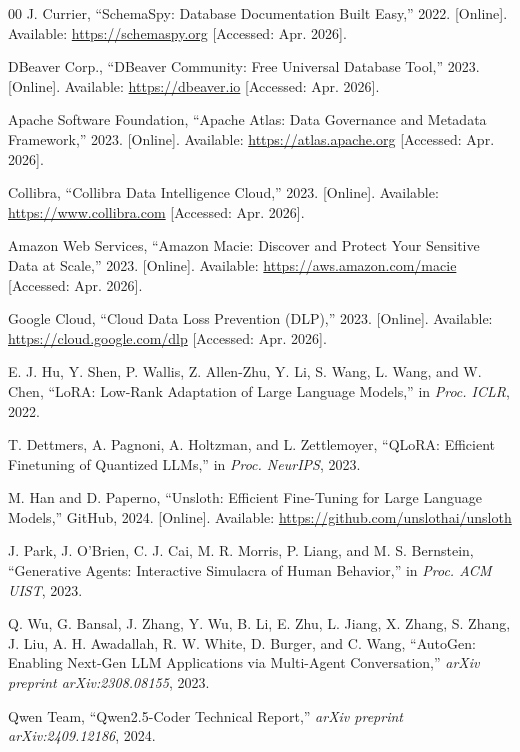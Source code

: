 \documentclass[conference]{IEEEtran}
\begin{document}
\begin{thebibliography}{00}
J. Currier, ``SchemaSpy: Database Documentation Built Easy,''
2022. [Online]. Available: \url{https://schemaspy.org}
[Accessed: Apr. 2026].

DBeaver Corp., ``DBeaver Community: Free Universal Database Tool,''
2023. [Online]. Available: \url{https://dbeaver.io}
[Accessed: Apr. 2026].

Apache Software Foundation, ``Apache Atlas: Data Governance and Metadata
Framework,'' 2023. [Online]. Available: \url{https://atlas.apache.org}
[Accessed: Apr. 2026].

Collibra, ``Collibra Data Intelligence Cloud,''
2023. [Online]. Available: \url{https://www.collibra.com}
[Accessed: Apr. 2026].

Amazon Web Services, ``Amazon Macie: Discover and Protect Your Sensitive Data
at Scale,'' 2023. [Online]. Available: \url{https://aws.amazon.com/macie}
[Accessed: Apr. 2026].

Google Cloud, ``Cloud Data Loss Prevention (DLP),''
2023. [Online]. Available: \url{https://cloud.google.com/dlp}
[Accessed: Apr. 2026].

E. J. Hu, Y. Shen, P. Wallis, Z. Allen-Zhu, Y. Li, S. Wang, L. Wang,
and W. Chen, ``LoRA: Low-Rank Adaptation of Large Language Models,''
in \textit{Proc. ICLR}, 2022.

T. Dettmers, A. Pagnoni, A. Holtzman, and L. Zettlemoyer,
``QLoRA: Efficient Finetuning of Quantized LLMs,''
in \textit{Proc. NeurIPS}, 2023.

M. Han and D. Paperno, ``Unsloth: Efficient Fine-Tuning for Large Language
Models,'' GitHub, 2024. [Online]. Available:
\url{https://github.com/unslothai/unsloth}

J. Park, J. O'Brien, C. J. Cai, M. R. Morris, P. Liang, and M. S. Bernstein,
``Generative Agents: Interactive Simulacra of Human Behavior,''
in \textit{Proc. ACM UIST}, 2023.

Q. Wu, G. Bansal, J. Zhang, Y. Wu, B. Li, E. Zhu, L. Jiang, X. Zhang,
S. Zhang, J. Liu, A. H. Awadallah, R. W. White, D. Burger, and C. Wang,
``AutoGen: Enabling Next-Gen LLM Applications via Multi-Agent Conversation,''
\textit{arXiv preprint arXiv:2308.08155}, 2023.

Qwen Team, ``Qwen2.5-Coder Technical Report,''
\textit{arXiv preprint arXiv:2409.12186}, 2024.


\end{thebibliography}
\end{document}
